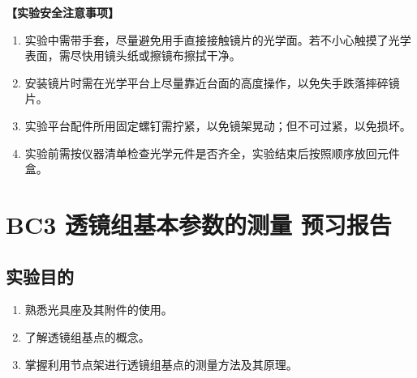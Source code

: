 \documentclass[dvipsnames, svgnames,a4paper,11pt]{article}
\begin{document}
	\textbf{【实验安全注意事项】}	
	\begin{enumerate}
		\item 实验中需带手套，尽量避免用手直接接触镜片的光学面。若不小心触摸了光学表面，需尽快用镜头纸或擦镜布擦拭干净。	
		\item 安装镜片时需在光学平台上尽量靠近台面的高度操作，以免失手跌落摔碎镜片。
		\item 实验平台配件所用固定螺钉需拧紧，以免镜架晃动；但不可过紧，以免损坏。
		\item 实验前需按仪器清单检查光学元件是否齐全，实验结束后按照顺序放回元件盒。
	\end{enumerate}
	
	
	
	
	
	\clearpage
	\tableofcontents
	\clearpage
	
	
	
	\setcounter{section}{0}
	\section{BC3 透镜组基本参数的测量 \quad\heiti 预习报告}
	
	\subsection{实验目的}
	\begin{enumerate}
		\item 熟悉光具座及其附件的使用。
		\item 了解透镜组基点的概念。
		\item 掌握利用节点架进行透镜组基点的测量方法及其原理。
	\end{enumerate}
	
\end{document}
